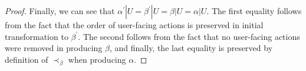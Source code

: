 \begin{proof}
  Finally, we can see that $\alpha^\prime | U = \beta^\prime | U = \beta | U = \alpha | U$. The first equality follows from the fact that the order of user-facing actions is preserved in initial transformation to $\beta^\prime$. The second follows from the fact that no user-facing actions were removed in producing $\beta$, and finally, the last equality is preserved by definition of $\prec_\beta$ when producing $\alpha$.
\end{proof}